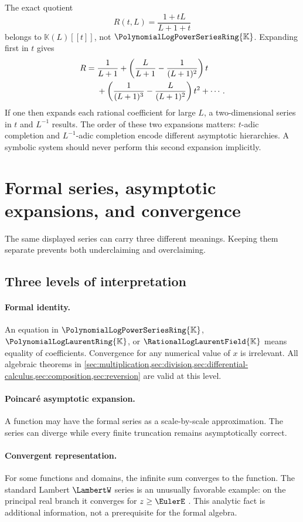 \documentclass[11pt]{article}
\theoremstyle{pltheorem}
\newcommand{\K}{\mathbb K}
\newcommand{\PL}{\PolynomialLogPowerSeriesRing{\K}}
\newcommand{\PLL}{\PolynomialLogLaurentRing{\K}}
\newcommand{\QPL}{\RationalLogLaurentField{\K}}
\begin{document}
The exact quotient
\begin{equation}\label{eq:rational-log-example}
 R(t,L)=\frac{1+tL}{L+1+t}
\end{equation}
belongs to \(\K(L)[[t]]\), not \(\PL\).  Expanding first in \(t\) gives
\begin{align}
 R={}&\frac1{L+1}
 +\left(\frac{L}{L+1}-\frac1{(L+1)^2}\right)t
 \notag\\
 &+\left(\frac1{(L+1)^3}-\frac{L}{(L+1)^2}\right)t^2+\cdots.
 \label{eq:rational-log-t-expansion}
\end{align}
If one then expands each rational coefficient for large \(L\), a two-dimensional series in \(t\) and \(L^{-1}\) results.  The order of these two expansions matters: \(t\)-adic completion and \(L^{-1}\)-adic completion encode different asymptotic hierarchies.  A symbolic system should never perform this second expansion implicitly.

\section{Formal series, asymptotic expansions, and convergence}
\label{sec:formal-analytic}

The same displayed series can carry three different meanings.  Keeping them separate prevents both underclaiming and overclaiming.

\subsection{Three levels of interpretation}

\paragraph{Formal identity.}
An equation in \(\PL\), \(\PLL\), or \(\QPL\) means equality of coefficients.  Convergence for any numerical value of \(x\) is irrelevant.  All algebraic theorems in \cref{sec:multiplication,sec:division,sec:differential-calculus,sec:composition,sec:reversion} are valid at this level.

\paragraph{Poincar\'e asymptotic expansion.}
A function may have the formal series as a scale-by-scale approximation.  The series can diverge while every finite truncation remains asymptotically correct.

\paragraph{Convergent representation.}
For some functions and domains, the infinite sum converges to the function.  The standard Lambert \(\LambertW\) series is an unusually favorable example: on the principal real branch it converges for \(z\ge\EulerE\) \cite{dlmf-W}.  This analytic fact is additional information, not a prerequisite for the formal algebra.
\end{document}

